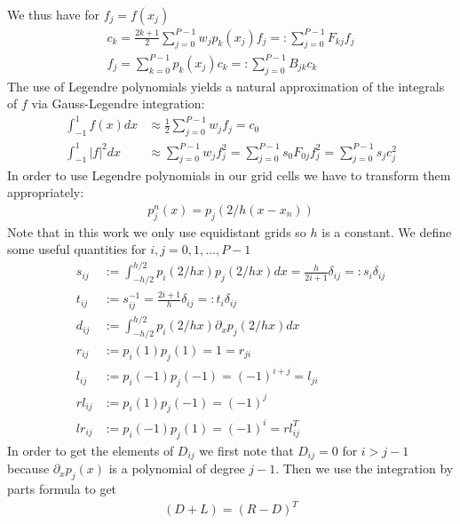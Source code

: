 \documentclass[a4paper,12pt]{scrartcl}
\begin{document}
We thus have for $f_j = f(x_j)$
\begin{subequations}
\begin{align}
    c_k = \frac{2k+1}{2}\sum_{j=0}^{P-1}w_j p_k(x_j) f_j =: \sum_{j=0}^{P-1} F_{kj}f_j\\
    f_j = \sum_{k=0}^{P-1} p_k(x_j) c_k =: \sum_{j=0}^{P-1} B_{jk}c_k
\end{align}
\end{subequations}
The use of Legendre polynomials yields a natural approximation of the integrals of $f$
via Gauss-Legendre integration:
\begin{align}
   \int_{-1}^1 f(x) dx &\approx  \frac{1}{2}\sum_{j=0}^{P-1} w_j f_j = c_0 \\
   \int_{-1}^1 |f|^2 dx &\approx \sum_{j=0}^{P-1} w_jf_j^2 = \sum_{j=0}^{P-1}s_0 F_{0j}f_j^2 = \sum_{j=0}^{P-1} s_jc_j^2  
    \label{}
\end{align}
In order to use Legendre polynomials in our grid cells we have to transform them 
appropriately:
\begin{align}
    p^n_j(x) = p_j( 2/h(x-x_n))
    \label{}
\end{align}
Note that in this work we only use equidistant grids so $h$ is a constant.
We define some useful quantities for $i,j=0,1,\dots,P-1$
\begin{subequations}
    \begin{align}
        s_{ij} &:= \int_{-h/2}^{h/2} p_i(2/h x)p_j(2/h x) dx = \frac{h}{2i+1}\delta_{ij} =: s_i \delta_{ij}\\ 
        t_{ij} &:= s^{-1}_{ij} = \frac{2i+1}{h}\delta_{ij} =: t_i \delta_{ij}\\
        d_{ij} &:= \int_{-h/2}^{h/2} p_i(2/h x)\partial_xp_j(2/h x) dx\\
        r_{ij} &:= p_i(1)p_j(1) = 1 = r_{ji}\\
        l_{ij} &:= p_i(-1)p_j(-1) = (-1)^{i+j} = l_{ji}\\
        rl_{ij}&:= p_i(1)p_j(-1) = (-1)^j\\
        lr_{ij}&:= p_i(-1)p_j(1) = (-1)^i = rl^T_{ij}
        \label{eq:legendre_operators}
    \end{align}
\end{subequations}
In order to get the elements of $D_{ij}$ we first note that $D_{ij} = 0$ for
$i > j-1$ because $\partial_x p_j(x)$ is a polynomial of degree $j-1$. Then
we use the integration by parts formula to get
\begin{align}
    (D+L) = (R-D)^T
    \label{eq:legendre_derivative}
\end{align}
\end{document}

